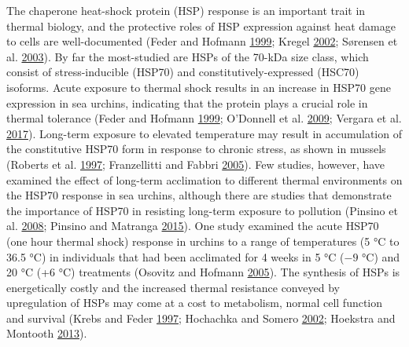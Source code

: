 \documentclass[a4paper,10pt, oneside]{memoir}
\begin{document}
The chaperone heat-shock protein (HSP) response is an important trait in thermal biology, and the protective roles of HSP expression against heat damage to cells are well-documented (Feder and Hofmann \protect\hyperlink{ref-Feder1999}{1999}; Kregel \protect\hyperlink{ref-Kregel2002}{2002}; Sørensen et al. \protect\hyperlink{ref-Sorensen2003}{2003}).
By far the most-studied are HSPs of the 70-kDa size class, which consist of stress-inducible (HSP70) and constitutively-expressed (HSC70) isoforms.
Acute exposure to thermal shock results in an increase in HSP70 gene expression in sea urchins, indicating that the protein plays a crucial role in thermal tolerance (Feder and Hofmann \protect\hyperlink{ref-Feder1999}{1999}; O'Donnell et al. \protect\hyperlink{ref-ODonnell2009}{2009}; Vergara et al. \protect\hyperlink{ref-Vergara2017}{2017}).
Long-term exposure to elevated temperature may result in accumulation of the constitutive HSP70 form in response to chronic stress, as shown in mussels (Roberts et al. \protect\hyperlink{ref-Roberts1997}{1997}; Franzellitti and Fabbri \protect\hyperlink{ref-Franzellitti2005}{2005}).
Few studies, however, have examined the effect of long-term acclimation to different thermal environments on the HSP70 response in sea urchins, although there are studies that demonstrate the importance of HSP70 in resisting long-term exposure to pollution (Pinsino et al. \protect\hyperlink{ref-Pinsino2008}{2008}; Pinsino and Matranga \protect\hyperlink{ref-Pinsino2015}{2015}).
One study examined the acute HSP70 (one hour thermal shock) response in urchins to a range of temperatures (5 °C to 36.5 °C) in individuals that had been acclimated for 4 weeks in 5 °C (\(-9\) °C) and 20 °C (+6 °C) treatments (Osovitz and Hofmann \protect\hyperlink{ref-Osovitz2005}{2005}).
The synthesis of HSPs is energetically costly and the increased thermal resistance conveyed by upregulation of HSPs may come at a cost to metabolism, normal cell function and survival (Krebs and Feder \protect\hyperlink{ref-Krebs1997}{1997}; Hochachka and Somero \protect\hyperlink{ref-Hochachka2002}{2002}; Hoekstra and Montooth \protect\hyperlink{ref-Hoekstra2013}{2013}).
\end{document}
